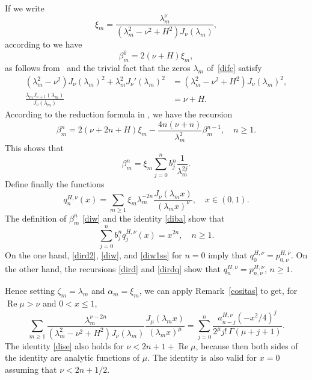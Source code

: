 \documentclass[12pt,leqno]{amsart}
\numberwithin{equation}{section}
\theoremstyle{plain}
\renewcommand{\Re}{\operatorname{Re}}
\begin{document}
If we write
\begin{equation*}
\xi_m = \frac{\lambda_m^{\nu}}{(\lambda_m^2-\nu^2+H^2)J_\nu(\lambda_m)},
\end{equation*}
according to \cite[\S\,18.12, (2), p.~581]{Wat} we have
\begin{equation}
\label{diw1ss}
\beta_m^0=2(\nu+H)\xi_m,
\end{equation}
as follows from~\cite[\S\,18.12, (2), p.~581]{Wat} and the trivial fact that the zeros $\lambda_m$ of~\eqref{difc} satisfy
\begin{align*}
(\lambda_m^2-\nu^2) J_\nu(\lambda_m)^2+\lambda_m^2 J_\nu'(\lambda_m)^2
&= (\lambda_m^2-\nu^2+H^2) J_\nu(\lambda_m)^2, \\
\frac{\lambda_m J_{\nu+1}(\lambda_m)}{J_{\nu}(\lambda_m)} &= \nu+H.
\end{align*}
According to the reduction formula in \cite[\S\,18.12, p.~581]{Wat}, we have the recursion
\[
\beta_m^n = 2(\nu+2n+H)\xi_m-\frac{4n(\nu+n)}{\lambda_m^2}\beta_m^{n-1},\quad n\ge 1.
\]
This shows that
\begin{equation}
\label{diba}
\beta_m^n = \xi_m \sum_{j=0}^nb_j^n\frac{1}{\lambda_m^{2j}}.
\end{equation}
Define finally the functions
\begin{equation*}
q_{n}^{H,\nu}(x)= \sum_{m\ge 1}\xi_m\lambda_m^{-2n}\frac{J_{\nu}(\lambda_m x)}{(\lambda_m x)^\nu},\quad x\in (0,1).
\end{equation*}
The definition of $\beta_m^n$ \eqref{diw} and the identity \eqref{diba} show that
\begin{equation}
\label{dirdq}
\sum_{j=0}^n b_j^n q_{j}^{H,\nu}(x) = x^{2n},\quad n\ge 1.
\end{equation}
On the one hand, \eqref{dird2}, \eqref{diw}, and \eqref{diw1ss} for $n=0$ imply that $q_{0}^{H,\nu}=p_{0,\nu}^{H,\nu}$. On the other hand, the recursions \eqref{dird} and \eqref{dirdq} show that $q_{n}^{H,\nu}=p_{n,\nu}^{H,\nu}$, $n\ge 1$.

Hence setting $\zeta_m=\lambda_m$ and $\alpha_m=\xi_m$, we can apply Remark~\ref{cositas} to get, for $\Re \mu>\nu$ and $0<x\le 1$,
\begin{equation}
\label{dise}
\sum_{m\ge 1} \frac{\lambda_m^{\nu-2n}}{(\lambda_m^2-\nu^2+H^2)J_\nu(\lambda_m)}
\frac{J_{\mu}(\lambda_m x)}{(\lambda_m x)^\mu}
= \sum_{j=0}^n\frac{a_{n-j}^{H,\nu}\left(-x^2/4\right)^{j}}{2^{\mu}j!\,\Gamma(\mu+j+1)}.
\end{equation}
The identity \eqref{dise} also holds for $\nu<2n+1+\Re \mu$, because then both sides of the identity are analytic functions of $\mu$. The identity is also valid for $x=0$ assuming that $\nu<2n+1/2$.
\end{document}
